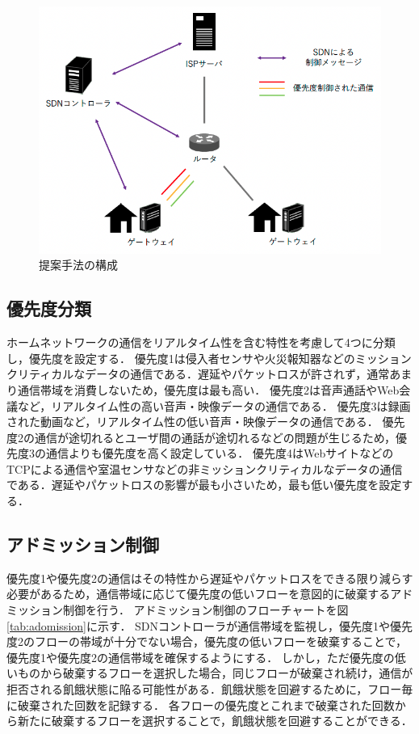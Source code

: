 \documentclass[a4paper,10pt,twocolumn,uplatex]{jsarticle}
\begin{document}
\begin{figure}[t]
	\begin{centering}
    \includegraphics[width=\linewidth]{img/proposal.png}
    \caption{提案手法の構成}
    \label{tab:proposal}
    \end{centering}
\end{figure}

\subsection{優先度分類}
\label{priority}
ホームネットワークの通信をリアルタイム性を含む特性を考慮して4つに分類し，優先度を設定する．
優先度1は侵入者センサや火災報知器などのミッションクリティカルなデータの通信である．遅延やパケットロスが許されず，通常あまり通信帯域を消費しないため，優先度は最も高い．
優先度2は音声通話やWeb会議など，リアルタイム性の高い音声・映像データの通信である．
優先度3は録画された動画など，リアルタイム性の低い音声・映像データの通信である．
優先度2の通信が途切れるとユーザ間の通話が途切れるなどの問題が生じるため，優先度3の通信よりも優先度を高く設定している．
優先度4はWebサイトなどのTCPによる通信や室温センサなどの非ミッションクリティカルなデータの通信である．遅延やパケットロスの影響が最も小さいため，最も低い優先度を設定する．\par

\subsection{アドミッション制御}
優先度1や優先度2の通信はその特性から遅延やパケットロスをできる限り減らす必要があるため，通信帯域に応じて優先度の低いフローを意図的に破棄するアドミッション制御を行う．
アドミッション制御のフローチャートを図\ref{tab:adomission}に示す．
SDNコントローラが通信帯域を監視し，優先度1や優先度2のフローの帯域が十分でない場合，優先度の低いフローを破棄することで，優先度1や優先度2の通信帯域を確保するようにする．
しかし，ただ優先度の低いものから破棄するフローを選択した場合，同じフローが破棄され続け，通信が拒否される飢餓状態に陥る可能性がある．飢餓状態を回避するために，フロー毎に破棄された回数を記録する．
各フローの優先度とこれまで破棄された回数から新たに破棄するフローを選択することで，飢餓状態を回避することができる．
\end{document}
